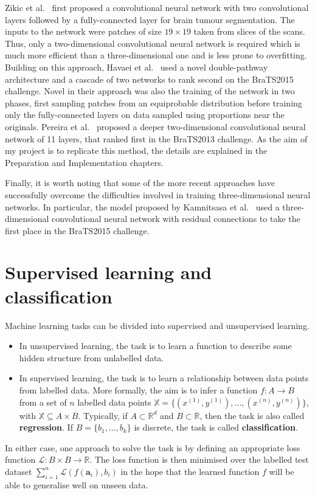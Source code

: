 \documentclass[12pt,a4paper,twoside,openright]{report}
\begin{document}
Zikic et al.\ \cite{zikic} first proposed a convolutional neural network with two convolutional layers followed by a fully-connected layer for brain tumour segmentation. The inputs to the network were patches of size $19 \times 19$ taken from slices of the scans. Thus, only a two-dimensional convolutional neural network is required which is much more efficient than a three-dimensional one and is less prone to overfitting. Building on this approach, Havaei et al.\ \cite{havaei} used a novel double-pathway architecture and a cascade of two networks to rank second on the BraTS2015 challenge. Novel in their approach was also the training of the network in two phases, first sampling patches from an equiprobable distribution before training only the fully-connected layers on data sampled using proportions near the originals. Pereira et al.\ \cite{pereira} proposed a deeper two-dimensional convolutional neural network of 11 layers, that ranked first in the BraTS2013 challenge. As the aim of my project is to replicate this method, the details are explained in the Preparation and Implementation chapters. 

Finally, it is worth noting that some of the more recent approaches have successfully overcome the difficulties involved in training three-dimensional neural networks. In particular, the model proposed by Kamnitsasa et al.\ \cite{kamnitas} used a three-dimensional convolutional neural network with residual connections \cite{resnet} to take the first place in the BraTS2015 challenge.

\section{Supervised learning and classification}
Machine learning tasks can be divided into supervised and unsupervised learning.
\begin{itemize}
	\item In unsupervised learning, the task is to learn a function to describe some hidden structure from unlabelled data. 
	\item In supervised learning, the task is to learn a relationship between data points from labelled data. More formally, the aim is to infer a function $f: A \to B$ from a set of $n$ labelled data points $\mathbb{X} = \{(x^{(1)}, y^{(1)}), ..., (x^{(n)}, y^{(n)})\}$, with $\mathbb{X} \subseteq A \times B$. Typically, if $A \subset \mathbb{R}^d$ and $B \subset \mathbb{R}$, then the task is also called \textbf{regression}. If $B = \{b_1, ..., b_k\}$ is discrete, the task is called \textbf{classification}. 
\end{itemize} 
In either case, one approach to solve the task is by defining an appropriate loss function $\mathcal{L}: B \times B \to \mathbb{R}$. The loss function is then minimised over the labelled test dataset $\sum_{i=1}^n \mathcal{L}(f(\textbf{a}_i), b_i)$ in the hope that the learned function $f$ will be able to generalise well on unseen data.
\end{document}
